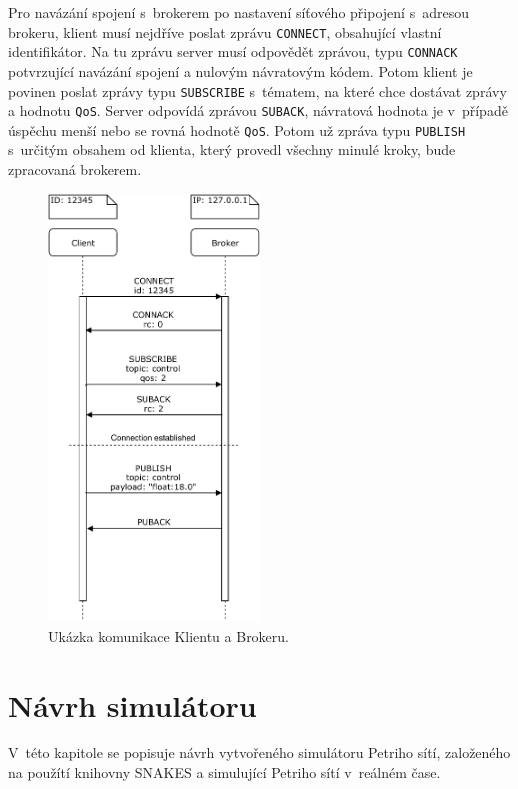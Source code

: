 Pro navázání spojení s~brokerem po nastavení síťového připojení s~adresou brokeru, klient musí nejdříve poslat zprávu \texttt{CONNECT}, obsahující vlastní identifikátor. Na tu zprávu server musí odpovědět zprávou,  typu \texttt{CONNACK} potvrzující navázání spojení a nulovým návratovým kódem. Potom klient je povinen poslat zprávy typu \texttt{SUBSCRIBE} s~tématem, na které chce dostávat zprávy a hodnotu \texttt{QoS}. Server odpovídá zprávou \texttt{SUBACK}, návratová hodnota je v~případě úspěchu menší nebo se rovná  hodnotě \texttt{QoS}. Potom už zpráva typu \texttt{PUBLISH} s~určitým obsahem od klienta, který provedl všechny minulé kroky, bude zpracovaná brokerem.

\begin{figure}[hbt]
 \centering
 \includegraphics[width=0.5\textwidth]{obrazky-figures/MQTT-flow.pdf}
 \caption{Ukázka komunikace Klientu a Brokeru.}
 \label{mqtt-flow}
\end{figure}

\chapter{Návrh simulátoru}
\label{chap:arch-simul}

V~této kapitole se popisuje návrh vytvořeného simulátoru Petriho sítí, založeného na použítí knihovny SNAKES a simulující Petriho sítí v~reálném čase.

